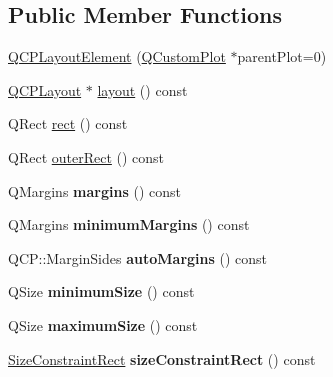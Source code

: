 \subsection*{Public Member Functions}
\begin{DoxyCompactItemize}
\item 
\hyperlink{classQCPLayoutElement_a8947f0ada17e672aaba3d424cbbb67e3}{Q\+C\+P\+Layout\+Element} (\hyperlink{classQCustomPlot}{Q\+Custom\+Plot} $\ast$parent\+Plot=0)
\item 
\hyperlink{classQCPLayout}{Q\+C\+P\+Layout} $\ast$ \hyperlink{classQCPLayoutElement_a6235f5384db871fc6e3387a1bc558b0d}{layout} () const 
\item 
Q\+Rect \hyperlink{classQCPLayoutElement_affdfea003469aac3d0fac5f4e06171bc}{rect} () const 
\item 
Q\+Rect \hyperlink{classQCPLayoutElement_a60bbddee2d1230c2414bd776f44d17b8}{outer\+Rect} () const 
\item 
Q\+Margins {\bfseries margins} () const \hypertarget{classQCPLayoutElement_a85ff977dfcced84eef32d9f819ec9543}{}\label{classQCPLayoutElement_a85ff977dfcced84eef32d9f819ec9543}

\item 
Q\+Margins {\bfseries minimum\+Margins} () const \hypertarget{classQCPLayoutElement_a60ec7f377c26726174d536bffb632002}{}\label{classQCPLayoutElement_a60ec7f377c26726174d536bffb632002}

\item 
Q\+C\+P\+::\+Margin\+Sides {\bfseries auto\+Margins} () const \hypertarget{classQCPLayoutElement_a2f499b1179b3126e22d0d7508124ccb3}{}\label{classQCPLayoutElement_a2f499b1179b3126e22d0d7508124ccb3}

\item 
Q\+Size {\bfseries minimum\+Size} () const \hypertarget{classQCPLayoutElement_ae71f9230171d2d898e21dc461fc3df03}{}\label{classQCPLayoutElement_ae71f9230171d2d898e21dc461fc3df03}

\item 
Q\+Size {\bfseries maximum\+Size} () const \hypertarget{classQCPLayoutElement_a1fc85c79e15c2ab8051eccd455fccc4a}{}\label{classQCPLayoutElement_a1fc85c79e15c2ab8051eccd455fccc4a}

\item 
\hyperlink{classQCPLayoutElement_a0afb3e5773529e4bd20e448f81be4d2a}{Size\+Constraint\+Rect} {\bfseries size\+Constraint\+Rect} () const \hypertarget{classQCPLayoutElement_ad1785b700781fecf99f7b02e77b9ca03}{}\label{classQCPLayoutElement_ad1785b700781fecf99f7b02e77b9ca03}


\end{DoxyCompactItemize}
